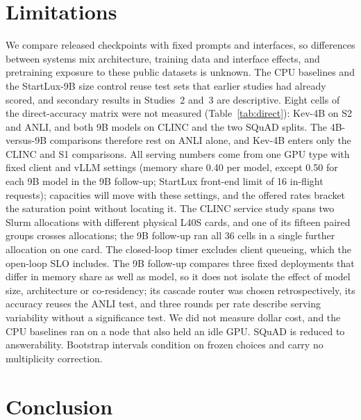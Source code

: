 \documentclass[11pt]{article}
\begin{document}
\section{Limitations}

We compare released checkpoints with fixed prompts and interfaces, so differences between systems mix architecture, training data and interface effects, and pretraining exposure to these public datasets is unknown. The CPU baselines and the StartLux-9B size control reuse test sets that earlier studies had already scored, and secondary results in Studies~2 and~3 are descriptive. Eight cells of the direct-accuracy matrix were not measured (Table~\ref{tab:direct}): Kev-4B on S2 and ANLI, and both 9B models on CLINC and the two SQuAD splits. The 4B-versus-9B comparisons therefore rest on ANLI alone, and Kev-4B enters only the CLINC and S1 comparisons. All serving numbers come from one GPU type with fixed client and vLLM settings (memory share 0.40 per model, except 0.50 for each 9B model in the 9B follow-up; StartLux front-end limit of 16 in-flight requests); capacities will move with these settings, and the offered rates bracket the saturation point without locating it. The CLINC service study spans two Slurm allocations with different physical L40S cards, and one of its fifteen paired groups crosses allocations; the 9B follow-up ran all 36 cells in a single further allocation on one card. The closed-loop timer excludes client queueing, which the open-loop SLO includes. The 9B follow-up compares three fixed deployments that differ in memory share as well as model, so it does not isolate the effect of model size, architecture or co-residency; its cascade router was chosen retrospectively, its accuracy reuses the ANLI test, and three rounds per rate describe serving variability without a significance test. We did not measure dollar cost, and the CPU baselines ran on a node that also held an idle GPU. SQuAD is reduced to answerability. Bootstrap intervals condition on frozen choices and carry no multiplicity correction.

\section{Conclusion}
\end{document}
